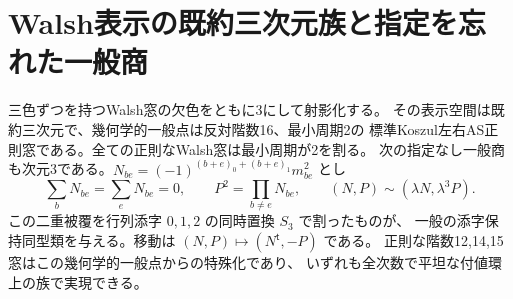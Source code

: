 \section{Walsh表示の既約三次元族と指定を忘れた一般商}
\label{sec:walsh-presentation-space}
\begin{theorem}\label{thm:walsh-presentation-space}
三色ずつを持つWalsh窓の欠色をともに3にして射影化する。
その表示空間は既約三次元で、幾何学的一般点は反対階数16、最小周期2の
標準Koszul左右AS正則窓である。全ての正則なWalsh窓は最小周期が2を割る。
次の指定なし一般商も次元3である。$N_{be}=(-1)^{(b+e)_0+(b+e)_1}m_{be}^2$ とし
\[
 \textstyle \sum_b N_{be}=\sum_eN_{be}=0,\qquad
 P^2=\prod_{b\ne e}N_{be},\qquad (N,P)\sim(\lambda N,\lambda^3 P).
\]
この二重被覆を行列添字 $0,1,2$ の同時置換 $S_3$ で割ったものが、
一般の添字保持同型類を与える。移動は $(N,P)\mapsto (N^{\mathsf t},-P)$ である。
正則な階数12,14,15窓はこの幾何学的一般点からの特殊化であり、
いずれも全次数で平坦な付値環上の族で実現できる。
\end{theorem}
